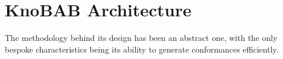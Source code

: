 \section{KnoBAB Architecture}
The methodology behind its design has been an abstract one, with the only bespoke characteristics being its ability to generate conformances efficiently. 

